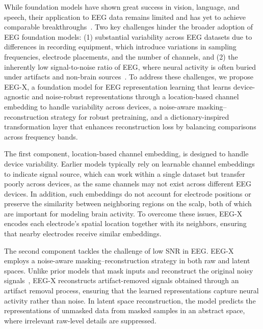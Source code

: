 \documentclass{article} %
\begin{document}
While foundation models have shown great success in vision, language, and speech, their application to EEG data remains limited and has yet to achieve comparable breakthroughs~\citep{weng2024self,foumani2023deep}. Two key challenges hinder the broader adoption of EEG foundation models: (1) substantial variability across EEG datasets due to differences in recording equipment, which introduce variations in sampling frequencies, electrode placements, and the number of channels, and (2) the inherently low signal-to-noise ratio of EEG, where neural activity is often buried under artifacts and non-brain sources~\citep{artifacts_survey,IClabel,rASR}. To address these challenges, we propose EEG-X, a foundation model for EEG representation learning that learns device-agnostic and noise-robust representations through a location-based channel embedding to handle variability across devices, a noise-aware masking–reconstruction strategy for robust pretraining, and a dictionary-inspired transformation layer that enhances reconstruction loss by balancing comparisons across frequency bands.


The first component, location-based channel embedding, is designed to handle device variability. Earlier models typically rely on learnable channel embeddings~\citep{Biot,LaBraM,EEGPT,cbramod} to indicate signal source, which can work within a single dataset but transfer poorly across devices, as the same channels may not exist across different EEG devices. %
In addition, such embeddings do not account for electrode positions or preserve the similarity between neighboring regions on the scalp, both of which are important for modeling brain activity. To overcome these issues, EEG-X encodes each electrode’s spatial location together with its neighbors, ensuring that nearby electrodes receive similar embeddings. %

The second component tackles the challenge of low SNR in EEG. EEG-X employs a noise-aware masking–reconstruction strategy in both raw and latent spaces. Unlike prior models that mask inputs and reconstruct the original noisy signals~\citep{Bendr,maeeg,EEGPT,cbramod}, EEG-X reconstructs artifact-removed signals obtained through an artifact removal process, ensuring that the learned representations capture neural activity rather than noise. In latent space reconstruction, the model predicts the representations of unmasked data from masked samples in an abstract space, where irrelevant raw-level details are suppressed. %
\end{document}
